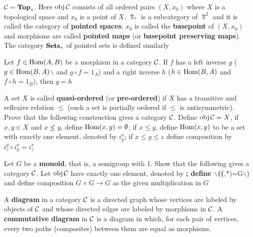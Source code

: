 \documentclass[11pt]{article}
\begin{document}
\begin{examplle}[]
\(\mathcal{C}=\operatorname{\textbf{Top}}_*\). Here \(\operatorname{obj}\mathcal{C}\) consists of all ordered pairs \((X,x_0)\) where \(X\) is a
topological space and \(x_0\) is a point of \(X\). \(\Top_*\) is a subcategory of \(\Top^2\) and
it is called the category of \textbf{pointed spaces}; \(x_0\) is called the \textbf{basepoint} of \((X,x_0)\) and
morphisms are called \textbf{pointed maps} (or \textbf{basepoint preserving maps}). The category \(\operatorname{\textbf{Sets}}_*\) of
pointed sets is defined similarly
\end{examplle}

\begin{exercise}
\label{ex0.7}
Let \(f\in\operatorname{Hom}(A,B)\) be a morphism in a category \(\mathcal{C}\). If \(f\) has a left inverse \(g\)
(\(g\in\operatorname{Hom}(B,A)\)$\backslash$ and \(g\circ f=1_A\)) and a right inverse \(h\) (\(h\in\operatorname{Hom}(B,A)\) and \(f\circ h=1_B\)),
then \(g=h\)
\end{exercise}

\begin{exercise}
\label{ex0.9}
A set \(X\) is called \textbf{quasi-ordered} (or \textbf{pre-ordered}) if \(X\) has a transitive and reflexive
relation \(\le\) (such a set is partially ordered if \(\le\) is antisymmetric). Prove that the
following construction gives a category \(\mathcal{C}\). Define \(\operatorname{obj}\mathcal{C}=X\), if \(x,y\in X\)
and \(x\not\le y\), define \(\operatorname{Hom}(x,y)=\emptyset\); if \(x\le y\), define \(\operatorname{Hom}(x,y)\) to be a set with
exactly one element, denoted by \(i_y^x\); if \(x\le y\le z\) define composition by \(i_z^y\circ i_y^x=i_z^x\)
\end{exercise}

\begin{exercise}
\label{ex0.10}
Let \(G\) be a \textbf{monoid}, that is, a semigroup with 1. Show that the following gives a
category \(\mathcal{C}\). Let \(\operatorname{obj}\mathcal{C}\) have exactly one element, denoted by \textbf{; define $\backslash$(\Hom(},*)=G$\backslash$) and
define composition \(G\times G\to G\) as the given multiplication in \(G\)
\end{exercise}

\begin{definition}[]
A \textbf{diagram} in a category \(\mathcal{C}\) is a directed graph whose vertices are labeled by objects of \(\mathcal{C}\) and
whose directed edges are labeled by morphisms in \(\mathcal{C}\). A \textbf{commutative diagram} in \(\mathcal{C}\) is a diagram in
which, for each pair of vertices, every two paths (composites) between them are equal as
morphisms.
\end{definition}
\end{document}
